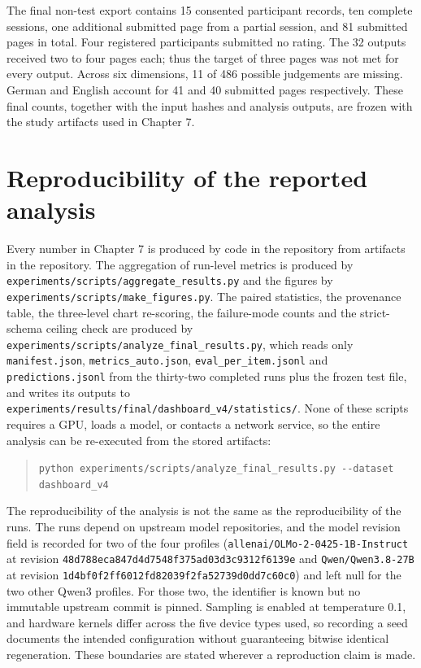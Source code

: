 The final non-test export contains 15 consented participant records, ten complete sessions, one additional submitted page from a partial session, and 81 submitted pages in total. Four registered participants submitted no rating. The 32 outputs received two to four pages each; thus the target of three pages was not met for every output. Across six dimensions, 11 of 486 possible judgements are missing. German and English account for 41 and 40 submitted pages respectively. These final counts, together with the input hashes and analysis outputs, are frozen with the study artifacts used in Chapter 7.

\section{Reproducibility of the reported analysis}

Every number in Chapter 7 is produced by code in the repository from artifacts in the repository. The aggregation of run-level metrics is produced by \nolinkurl{experiments/scripts/aggregate_results.py} and the figures by \nolinkurl{experiments/scripts/make_figures.py}. The paired statistics, the provenance table, the three-level chart re-scoring, the failure-mode counts and the strict-schema ceiling check are produced by \nolinkurl{experiments/scripts/analyze_final_results.py}, which reads only \texttt{manifest.json}, \texttt{metrics\_auto.json}, \texttt{eval\_per\_item.jsonl} and \texttt{predictions.jsonl} from the thirty-two completed runs plus the frozen test file, and writes its outputs to \nolinkurl{experiments/results/final/dashboard_v4/statistics/}. None of these scripts requires a GPU, loads a model, or contacts a network service, so the entire analysis can be re-executed from the stored artifacts:

\begin{quote}\small\nolinkurl{python experiments/scripts/analyze_final_results.py --dataset dashboard_v4}\end{quote}

The reproducibility of the analysis is not the same as the reproducibility of the runs. The runs depend on upstream model repositories, and the model revision field is recorded for two of the four profiles (\nolinkurl{allenai/OLMo-2-0425-1B-Instruct} at revision \nolinkurl{48d788eca847d4d7548f375ad03d3c9312f6139e} and \texttt{Qwen/Qwen3.8-27B} at revision \nolinkurl{1d4bf0f2ff6012fd82039f2fa52739d0dd7c60c0}) and left null for the two other Qwen3 profiles. For those two, the identifier is known but no immutable upstream commit is pinned. Sampling is enabled at temperature 0.1, and hardware kernels differ across the five device types used, so recording a seed documents the intended configuration without guaranteeing bitwise identical regeneration. These boundaries are stated wherever a reproduction claim is made.
